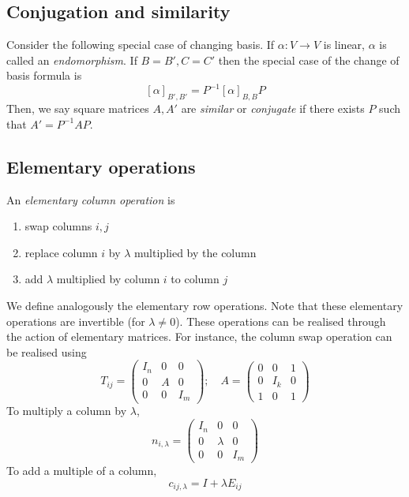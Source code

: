 \subsection{Conjugation and similarity}
Consider the following special case of changing basis.
If \( \alpha \colon V \to V \) is linear, \( \alpha \) is called an \textit{endomorphism}.
If \( B = B', C = C' \) then the special case of the change of basis formula is
\[
	[\alpha]_{B',B'} = P^{-1} [\alpha]_{B,B} P
\]
Then, we say square matrices \( A, A' \) are \textit{similar} or \textit{conjugate} if there exists \( P \) such that \( A' = P^{-1} A P \).

\subsection{Elementary operations}
\begin{definition}
	An \textit{elementary column operation} is
	\begin{enumerate}
		\item swap columns \( i, j \)
		\item replace column \( i \) by \( \lambda \) multiplied by the column
		\item add \( \lambda \) multiplied by column \( i \) to column \( j \)
	\end{enumerate}
\end{definition}
We define analogously the elementary row operations.
Note that these elementary operations are invertible (for \( \lambda \neq 0 \)).
These operations can be realised through the action of elementary matrices.
For instance, the column swap operation can be realised using
\[
	T_{ij} = \begin{pmatrix}
		I_n & 0 & 0   \\
		0   & A & 0   \\
		0   & 0 & I_m
	\end{pmatrix};\quad A = \begin{pmatrix}
		0 & 0   & 1 \\
		0 & I_k & 0 \\
		1 & 0   & 1
	\end{pmatrix}
\]
To multiply a column by \( \lambda \),
\[
	n_{i,\lambda} = \begin{pmatrix}
		I_n & 0       & 0   \\
		0   & \lambda & 0   \\
		0   & 0       & I_m
	\end{pmatrix}
\]
To add a multiple of a column,
\[
	c_{ij,\lambda} = I + \lambda E_{ij}
\]
